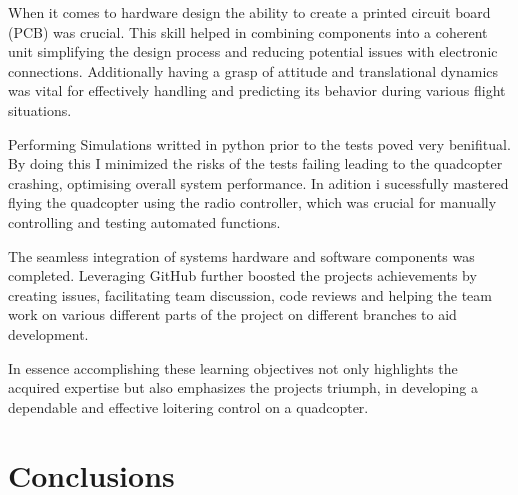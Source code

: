 \documentclass{report}
\begin{document}
When it comes to hardware design the ability to create a printed circuit board
(PCB) was crucial. This skill helped in combining components into a coherent
unit simplifying the design process and reducing potential issues with
electronic connections. Additionally having a grasp of attitude and
translational dynamics was vital for effectively handling and predicting its
behavior during various flight situations.

Performing Simulations writted in python prior to the tests poved very
benifitual. By doing this I minimized the risks of the tests failing leading to
the quadcopter crashing, optimising overall system performance. In adition i
sucessfully mastered flying the quadcopter using the radio controller, which was
crucial for manually controlling and testing automated functions.

The seamless integration of systems hardware and software components was
completed. Leveraging GitHub further boosted the projects achievements by
creating issues, facilitating team discussion, code reviews and helping the team
work on various different parts of the project on different branches to aid
development.

In essence accomplishing these learning objectives not only highlights the
acquired expertise but also emphasizes the projects triumph, in developing a
dependable and effective loitering control on a quadcopter.

\chapter{Conclusions}



\end{document}
